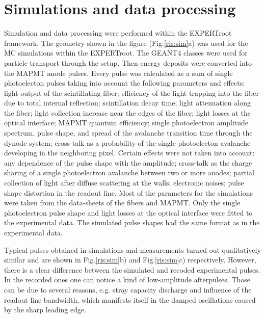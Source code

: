 \documentclass{webofc}
\newcommand{\er}{\textmd{EXPERTroot}}
\begin{document}
\section{Simulations and data processing}

Simulation and data processing were performed within the \er\, framework. The geometry shown in the figure (Fig.\ref{ris:sim}a) was used for the MC simulations within the \er. The GEANT4\cite{geant4} classes were used for particle transport through the setup. Then energy deposits were  converted into the MAPMT anode pulses. Every pulse was calculated as a sum of single photoelecton pulses taking into account the following parameters and effects: light output of the scintillating fiber; efficiency of the light trapping into the fiber due to total internal reflection; scintillation decay time; light attenuation along the fiber; light collection increase near the edges of the fiber; light losses at the optical interface; MAPMT quantum efficiency; single photoelectron amplitude spectrum, pulse shape, and spread of the avalanche transition time through the dynode system; cross-talk as a probability of the single photoelecton avalanche developing in the neighboring pixel.
Certain effects were not taken into account: any dependence of the pulse shape with the amplitude; cross-talk as the charge sharing of a single photoelectron avalanche between two or more anodes; partial collection of light after diffuse scattering at the walls; electronic noises; pulse shape distortion in the readout line. Most of the parameters for the simulations were taken from the data-sheets of the fibers and MAPMT.  Only the single photoelectron pulse shape and light losses at the optical interface were fitted to the experimental data. The simulated pulse shapes had the same format as in the experimental data.

Typical pulses obtained in simulations and measurements turned out qualitatively similar and are shown in Fig.\ref{ris:sim}b) and Fig.\ref{ris:sim}c) respectively. However, there is a clear difference between the simulated and recoded experimental pulses. In the recorded ones one can notice a kind of low-amplitude afterpulses.  Those can be due to several reasons, e.g. stray capacity discharge and influence of the readout line bandwidth, which manifests itself in the damped oscillations caused by the sharp leading edge.
\end{document}
